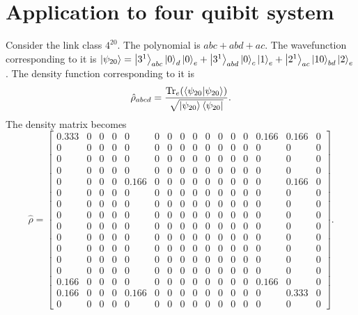 \documentclass{amsart}
\theoremstyle{plain}
\theoremstyle{definition}
\theoremstyle{plain}
\begin{document}
\section{Application to four quibit system}
Consider the link class $4^{20}$. The polynomial is $abc+ abd + ac$. The wavefunction corresponding to it is $\ket{\psi_{20}} = \ket{3^1}_{abc}\ket{0}_{d} \ket{0}_e + \ket{3^1}_{abd} \ket{0}_c \ket{1}_e + \ket{2^1}_{ac} \ket{10}_{bd} \ket{2}_e$. The density function corresponding to it is 
\begin{equation*}
	\hat{\rho}_{abcd} = \frac{\Tr_e(\bra{\psi_{20}} \ket{\psi_{20}})}{\sqrt{\ket{\psi_{20}} \bra{\psi_{20}}}}.
\end{equation*}
The density matrix becomes 
\begin{equation*}
	\hat{\rho} = \left[\begin{array}{cccccccccccccccc}0.333 & 0 & 0 & 0 & 0 & 0 & 0 & 0 & 0 & 0 & 0 & 0 & 0 & 0.166 & 0.166 & 0\\0 & 0 & 0 & 0 & 0 & 0 & 0 & 0 & 0 & 0 & 0 & 0 & 0 & 0 & 0 & 0\\0 & 0 & 0 & 0 & 0 & 0 & 0 & 0 & 0 & 0 & 0 & 0 & 0 & 0 & 0 & 0\\0 & 0 & 0 & 0 & 0 & 0 & 0 & 0 & 0 & 0 & 0 & 0 & 0 & 0 & 0 & 0\\0 & 0 & 0 & 0 & 0.166 & 0 & 0 & 0 & 0 & 0 & 0 & 0 & 0 & 0 & 0.166 & 0\\0 & 0 & 0 & 0 & 0 & 0 & 0 & 0 & 0 & 0 & 0 & 0 & 0 & 0 & 0 & 0\\0 & 0 & 0 & 0 & 0 & 0 & 0 & 0 & 0 & 0 & 0 & 0 & 0 & 0 & 0 & 0\\0 & 0 & 0 & 0 & 0 & 0 & 0 & 0 & 0 & 0 & 0 & 0 & 0 & 0 & 0 & 0\\0 & 0 & 0 & 0 & 0 & 0 & 0 & 0 & 0 & 0 & 0 & 0 & 0 & 0 & 0 & 0\\0 & 0 & 0 & 0 & 0 & 0 & 0 & 0 & 0 & 0 & 0 & 0 & 0 & 0 & 0 & 0\\0 & 0 & 0 & 0 & 0 & 0 & 0 & 0 & 0 & 0 & 0 & 0 & 0 & 0 & 0 & 0\\0 & 0 & 0 & 0 & 0 & 0 & 0 & 0 & 0 & 0 & 0 & 0 & 0 & 0 & 0 & 0\\0 & 0 & 0 & 0 & 0 & 0 & 0 & 0 & 0 & 0 & 0 & 0 & 0 & 0 & 0 & 0\\0.166 & 0 & 0 & 0 & 0 & 0 & 0 & 0 & 0 & 0 & 0 & 0 & 0 & 0.166 & 0 & 0\\0.166 & 0 & 0 & 0 & 0.166 & 0 & 0 & 0 & 0 & 0 & 0 & 0 & 0 & 0 & 0.333 & 0\\0 & 0 & 0 & 0 & 0 & 0 & 0 & 0 & 0 & 0 & 0 & 0 & 0 & 0 & 0 & 0\end{array}\right]
	.
\end{equation*}
\end{document}
